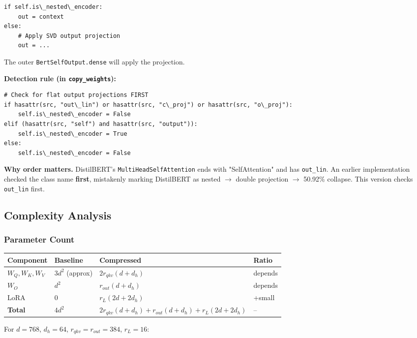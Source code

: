 \begin{lstlisting}
if self.is\_nested\_encoder:
    out = context
else:
    # Apply SVD output projection
    out = ...
\end{lstlisting}

The outer \texttt{BertSelfOutput.dense} will apply the projection.

\textbf{Detection rule (in \texttt{copy\_weights}):}

\begin{lstlisting}
# Check for flat output projections FIRST
if hasattr(src, "out\_lin") or hasattr(src, "c\_proj") or hasattr(src, "o\_proj"):
    self.is\_nested\_encoder = False
elif (hasattr(src, "self") and hasattr(src, "output")):
    self.is\_nested\_encoder = True
else:
    self.is\_nested\_encoder = False
\end{lstlisting}

\textbf{Why order matters.} DistilBERT's \texttt{MultiHeadSelfAttention} ends with 
"SelfAttention" and has \texttt{out\_lin}. An earlier implementation checked the 
class name \textbf{first}, mistakenly marking DistilBERT as nested $\to$ double 
projection $\to$ 50.92\% collapse. This version checks \texttt{out\_lin} first.

\subsection{Complexity Analysis}

\subsubsection{Parameter Count}

\begin{table}[H]
\centering
\small
\begin{tabular}{llll}
\toprule
\textbf{Component} & \textbf{Baseline} & \textbf{Compressed} & \textbf{Ratio} \\
\midrule
$W_Q, W_K, W_V$ & $3 d^2$ (approx) & $2 r_{qkv} (d + d_h)$ & depends \\
$W_O$ & $d^2$ & $r_{out} (d + d_h)$ & depends \\
LoRA & 0 & $r_L (2d + 2 d_h)$ & +small \\
\textbf{Total} & $4 d^2$ & $2 r_{qkv} (d+d_h) + r_{out}(d+d_h) + r_L(2d + 2d_h)$ & -- \\
\bottomrule
\end{tabular}
\end{table}

For $d = 768$, $d_h = 64$, $r_{qkv} = r_{out} = 384$, $r_L = 16$:

